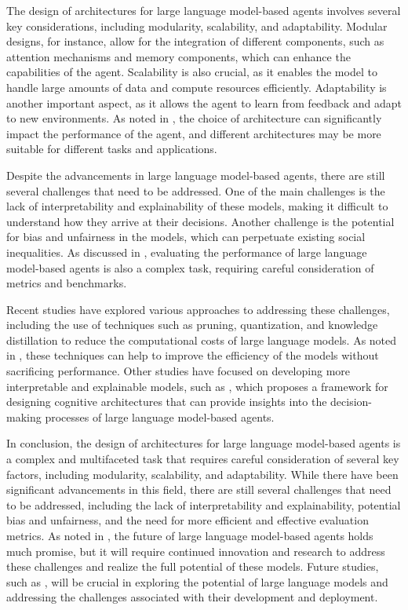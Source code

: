 \documentclass[11pt,a4paper]{article}
\begin{document}
The design of architectures for large language model-based agents involves several key considerations, including modularity, scalability, and adaptability. Modular designs, for instance, allow for the integration of different components, such as attention mechanisms and memory components, which can enhance the capabilities of the agent. Scalability is also crucial, as it enables the model to handle large amounts of data and compute resources efficiently. Adaptability is another important aspect, as it allows the agent to learn from feedback and adapt to new environments. As noted in \cite{doi:10.1145/3604237.3626869}, the choice of architecture can significantly impact the performance of the agent, and different architectures may be more suitable for different tasks and applications.

Despite the advancements in large language model-based agents, there are still several challenges that need to be addressed. One of the main challenges is the lack of interpretability and explainability of these models, making it difficult to understand how they arrive at their decisions. Another challenge is the potential for bias and unfairness in the models, which can perpetuate existing social inequalities. As discussed in \cite{doi:10.1145/3641289}, evaluating the performance of large language model-based agents is also a complex task, requiring careful consideration of metrics and benchmarks.

Recent studies have explored various approaches to addressing these challenges, including the use of techniques such as pruning, quantization, and knowledge distillation to reduce the computational costs of large language models. As noted in \cite{arxiv:2305.16264}, these techniques can help to improve the efficiency of the models without sacrificing performance. Other studies have focused on developing more interpretable and explainable models, such as \cite{arxiv:2309.02427}, which proposes a framework for designing cognitive architectures that can provide insights into the decision-making processes of large language model-based agents.

In conclusion, the design of architectures for large language model-based agents is a complex and multifaceted task that requires careful consideration of several key factors, including modularity, scalability, and adaptability. While there have been significant advancements in this field, there are still several challenges that need to be addressed, including the lack of interpretability and explainability, potential bias and unfairness, and the need for more efficient and effective evaluation metrics. As noted in \cite{doi:10.3390/app14052074}, the future of large language model-based agents holds much promise, but it will require continued innovation and research to address these challenges and realize the full potential of these models. Future studies, such as \cite{doi:10.34133/research.0646}, will be crucial in exploring the potential of large language models and addressing the challenges associated with their development and deployment.
\end{document}

